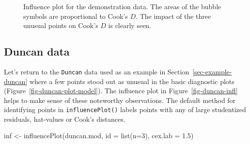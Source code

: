 \documentclass[
  letterpaper,
  10pt,
  krantz2]{krantz}
\makeatletter
\newenvironment{Shaded}{\begin{snugshade}}{\end{snugshade}}
\newcommand{\AttributeTok}[1]{\textcolor[rgb]{0.40,0.45,0.13}{#1}}
\newcommand{\DecValTok}[1]{\textcolor[rgb]{0.68,0.00,0.00}{#1}}
\newcommand{\FloatTok}[1]{\textcolor[rgb]{0.68,0.00,0.00}{#1}}
\newcommand{\FunctionTok}[1]{\textcolor[rgb]{0.28,0.35,0.67}{#1}}
\newcommand{\NormalTok}[1]{\textcolor[rgb]{0.00,0.23,0.31}{#1}}
\newcommand{\OtherTok}[1]{\textcolor[rgb]{0.00,0.23,0.31}{#1}}
\newenvironment{kframe}{%
  \medskip{}
  \setlength{\fboxsep}{.8em}
  \def\at@end@of@kframe{}%
  \ifinner\ifhmode%
  \def\at@end@of@kframe{\end{minipage}}%
  \begin{minipage}{\columnwidth}%
  \fi\fi%
  \def\FrameCommand##1{\hskip\@totalleftmargin \hskip-\fboxsep
  \colorbox{shadecolor}{##1}\hskip-\fboxsep
      \hskip-\linewidth \hskip-\@totalleftmargin \hskip\columnwidth}%
  \MakeFramed {\advance\hsize-\width
    \@totalleftmargin\z@ \linewidth\hsize
    \@setminipage}}%
{\par\unskip\endMakeFramed%
  \at@end@of@kframe}
\renewenvironment{Shaded}{\begin{kframe}}{\end{kframe}}
\makeatother
\begin{document}
\begin{figure}[H]


\caption{\label{fig-levdemo-infl}Influence plot for the demonstration
data. The areas of the bubble symbols are proportional to Cook's \(D\).
The impact of the three unusual points on Cook's \(D\) is clearly seen.}

\end{figure}%

\subsection{Duncan data}\label{sec-duncan-influence}

Let's return to the \texttt{Duncan} data used as an example in
Section~\ref{sec-example-duncan} where a few points stood out as unusual
in the basic diagnostic plots (Figure~\ref{fig-duncan-plot-model}). The
influence plot in Figure~\ref{fig-duncan-infl} helps to make sense of
these noteworthy observations. The default method for identifying points
in \texttt{influencePlot()} labels points with any of large studentized
residuals, hat-values or Cook's distances.

\begin{Shaded}
\begin{Highlighting}[]
\NormalTok{inf }\OtherTok{\textless{}{-}} \FunctionTok{influencePlot}\NormalTok{(duncan.mod, }\AttributeTok{id =} \FunctionTok{list}\NormalTok{(}\AttributeTok{n=}\DecValTok{3}\NormalTok{),}
                     \AttributeTok{cex.lab =} \FloatTok{1.5}\NormalTok{)}
\end{Highlighting}
\end{Shaded}
\end{document}
